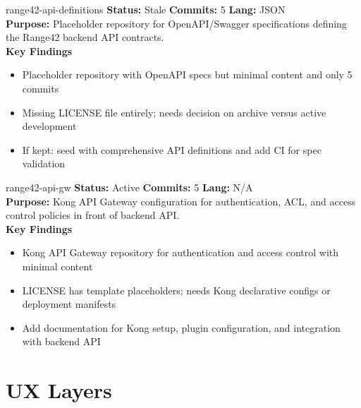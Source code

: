 \documentclass[aspectratio=169]{beamer}
\begin{document}
\begin{frame}{range42-api-definitions \; \faSitemap}
  \textbf{Status:} Stale \hfill \textbf{Commits:} 5 \hfill \textbf{Lang:} JSON\\[2mm]
  \textbf{Purpose:} Placeholder repository for OpenAPI/Swagger specifications defining the Range42 backend API contracts.\\[2mm]
  \textbf{Key Findings}
  \begin{itemize}
    \item Placeholder repository with OpenAPI specs but minimal content and only 5 commits
    \item Missing LICENSE file entirely; needs decision on archive versus active development
    \item If kept: seed with comprehensive API definitions and add CI for spec validation
  \end{itemize}
\end{frame}

\begin{frame}{range42-api-gw \; }
  \textbf{Status:} Active \hfill \textbf{Commits:} 5 \hfill \textbf{Lang:} N/A\\[2mm]
  \textbf{Purpose:} Kong API Gateway configuration for authentication, ACL, and access control policies in front of backend API.\\[2mm]
  \textbf{Key Findings}
  \begin{itemize}
    \item Kong API Gateway repository for authentication and access control with minimal content
    \item LICENSE has template placeholders; needs Kong declarative configs or deployment manifests
    \item Add documentation for Kong setup, plugin configuration, and integration with backend API
  \end{itemize}
\end{frame}

\section{UX Layers}
\end{document}
